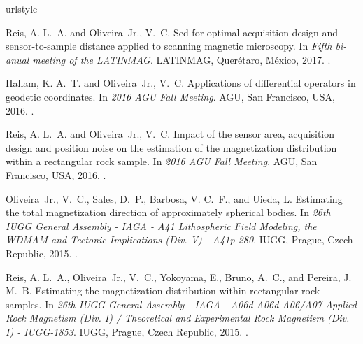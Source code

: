 
\nocite{*}

%
\begin{thebibliography}{10}
\providecommand{\natexlab}[1]{#1}
\expandafter\ifx\csname urlstyle\endcsname\relax
  \providecommand{\doi}[1]{doi:\discretionary{}{}{}#1}\else
  \providecommand{\doi}{doi:\discretionary{}{}{}\begingroup
  \urlstyle{rm}\Url}\fi

Reis, A. L.~A. and Oliveira~Jr., V.~C.
\newblock Sed for optimal acquisition design and sensor-to-sample distance
  applied to scanning magnetic microscopy.
\newblock In \emph{Fifth bi-anual meeting of the LATINMAG}. LATINMAG,
  Quer\'{e}taro, M\'{e}xico, 2017.
.

Hallam, K. A.~T. and Oliveira~Jr., V.~C.
\newblock Applications of differential operators in geodetic coordinates.
\newblock In \emph{2016 AGU Fall Meeting}. AGU, San Francisco, USA, 2016.
.

Reis, A. L.~A. and Oliveira~Jr., V.~C.
\newblock Impact of the sensor area, acquisition design and position noise on
  the estimation of the magnetization distribution within a rectangular rock
  sample.
\newblock In \emph{2016 AGU Fall Meeting}. AGU, San Francisco, USA, 2016.
.

Oliveira~Jr., V.~C., Sales, D.~P., Barbosa, V. C.~F., and Uieda, L.
\newblock Estimating the total magnetization direction of approximately
  spherical bodies.
\newblock In \emph{26th IUGG General Assembly - IAGA - A41 Lithospheric Field
  Modeling, the WDMAM and Tectonic Implications (Div. V) - A41p-280}. IUGG,
  Prague, Czech Republic, 2015.
.

Reis, A. L.~A., Oliveira~Jr., V.~C., Yokoyama, E., Bruno, A.~C., and Pereira,
  J. M.~B.
\newblock Estimating the magnetization distribution within rectangular rock
  samples.
\newblock In \emph{26th IUGG General Assembly - IAGA - A06d-A06d A06/A07
  Applied Rock Magnetism (Div. I) / Theoretical and Experimental Rock Magnetism
  (Div. I) - IUGG-1853}. IUGG, Prague, Czech Republic, 2015.
.


\end{thebibliography}
